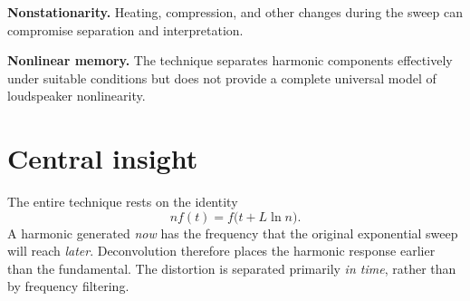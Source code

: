 \documentclass[11pt,a4paper]{article}
\begin{document}
\textbf{Nonstationarity.} Heating, compression, and other changes during the sweep can compromise separation and interpretation.

\textbf{Nonlinear memory.} The technique separates harmonic components effectively under suitable conditions but does not provide a complete universal model of loudspeaker nonlinearity.

\section*{Central insight}
The entire technique rests on the identity
\begin{equation}\boxed{nf(t)=f\bigl(t+L\ln n\bigr).}\end{equation}
A harmonic generated \emph{now} has the frequency that the original exponential sweep will reach \emph{later}. Deconvolution therefore places the harmonic response earlier than the fundamental. The distortion is separated primarily \emph{in time}, rather than by frequency filtering.
\end{document}
